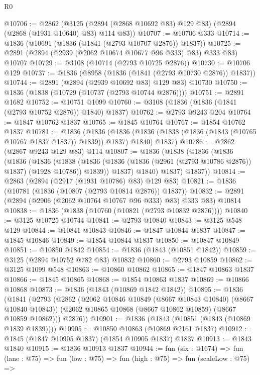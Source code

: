 \begin{lexlean}{R0}
\begin{coremodule}
@10706 := @2862
    (@3125 (@2894 (@2868 @10692 @83) @129 @83) (@2894 (@2868 (@1931 @10640) @83) @114 @83))
@10707 := @10706 @333
@10714 := @1836 (@10691 (@1836 (@1841 (@2793 @10707 @2876)) @1837))
@10725 := @2891 (@2894 (@2939 (@2062 @10674 @10677 @96 @333) @83) @333 @83) @10707
@10729 := @3108 (@10714 (@2793 @10725 @2876))
@10730 := @10706 @129
@10737 := @1836 (@8958 (@1836 (@1841 (@2793 @10730 @2876)) @1837))
@10744 := @2891 (@2894 (@2939 @10692 @83) @129 @83) @10730
@10750 := @1836 (@1838 (@10729 (@10737 (@2793 @10744 @2876))))
@10751 := @2891 @1682
@10752 := @10751 @1099
@10760 := @3108 (@1836 (@1836 (@1841 (@2793 @10752 @2876)) @1840) @1837)
@10762 := @2793 @9243 @204
@10764 := @1847 @10762 @1837
@10765 := @1845 @10764
@10767 := @1854 @10762 @1837
@10781 := @1836
    (@1836
      (@1836 (@1836 (@1838 (@1836 (@1843 (@10765 @10767 @1837 @1837)) @1839)) @1837) @1840)
      @1837)
@10786 := @2862 (@2867 @9243 @129 @83) @114
@10807 := @1836
    (@1838
      (@1836
        (@1836
          (@1836
            (@1836
              (@1838
                (@1836 (@1836 (@1836 (@2961 (@2793 @10786 @2876)) @1837) (@1928 @10786)) @1839))
              @1837)
            @1840)
          @1837)
        @1837))
@10814 := @2863 (@2894 (@2917 (@1931 @10786) @83) @129 @83)
@10821 := @1836 (@10781 (@1836 (@10807 (@2793 @10814 @2876)) @1837))
@10832 := @2891 (@2894 (@2906 (@2062 @10764 @10767 @96 @333) @83) @333 @83) @10814
@10838 := @1836 (@1838 (@10760 (@10821 (@2793 @10832 @2876))))
@10840 := @3125 @10725 @10744
@10841 := @2793 @10840
@10843 := @3125 @548 @129
@10844 := @10841 @10843
@10846 := @1847 @10844 @1837
@10847 := @1845 @10846
@10849 := @1854 @10844 @1837
@10850 := @10847 @10849
@10851 := @10850 @1842
@10854 := @1836 (@1843 (@10851 @1842))
@10859 := @3125 (@2894 @10752 @782 @83) @10832
@10860 := @2793 @10859
@10862 := @3125 @1099 @548
@10863 := @10860 @10862
@10865 := @1847 @10863 @1837
@10866 := @1845 @10865
@10868 := @1854 @10863 @1837
@10869 := @10866 @10868
@10873 := @1836 (@1843 (@10869 @1842 @1842))
@10895 := @1836
    (@1841
      (@2793
        (@2862
          (@2062 @10846 @10849 (@8667 @10843 @10840) (@8667 @10840 @10843))
          (@2062 @10865 @10868 (@8667 @10862 @10859) (@8667 @10859 @10862)))
        @2876))
@10901 := @1836 (@1843 (@10851 (@1843 (@10869 @1839 @1839))))
@10905 := @10850 @10863 (@10869 @2161 @1837)
@10912 := @1845 (@1847 @10905 @1837) (@1854 @10905 @1837) @1837
@10913 := @1843 @1840
@10915 := @1836 @10913 @1837
@10944 := fun (six : @1674) =>
  fun (lane : @75) =>
  fun (low : @75) =>
  fun (high : @75) =>
  fun (scaleLow : @75) =>

\end{coremodule}
\end{lexlean}
